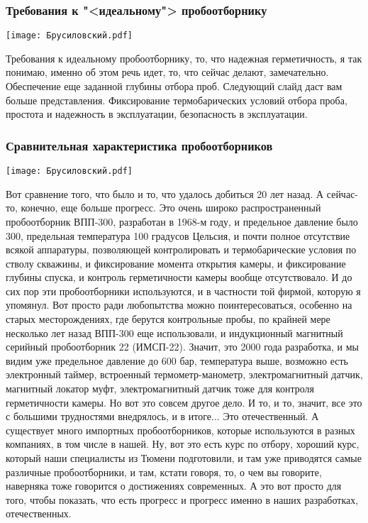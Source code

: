 \documentclass[main.tex]{subfiles}
\begin{document}
\subsubsection{Требования к "<идеальному"> пробоотборнику}

\begin{center}
\texttt{[image: Брусиловский.pdf]}
\end{center}

Требования к идеальному пробоотборнику, то, что надежная герметичность, я так понимаю, именно об этом речь идет, то, что сейчас делают, замечательно.
Обеспечение еще заданной глубины отбора проб.
Следующий слайд даст вам больше представления.
Фиксирование термобарических условий отбора проба, простота и надежность в эксплуатации, безопасность в эксплуатации.

\subsubsection{Сравнительная характеристика пробоотборников}

\begin{center}
\texttt{[image: Брусиловский.pdf]}
\end{center}

Вот сравнение того, что было и то, что удалось добиться 20 лет назад.
А сейчас-то, конечно, еще больше прогресс.
Это очень широко распространенный пробоотборник ВПП-300, разработан в 1968-м году, и предельное давление было 300, предельная температура 100 градусов Цельсия, и почти полное отсутствие всякой аппаратуры, позволяющей контролировать и термобарические условия по стволу скважины, и фиксирование момента открытия камеры, и фиксирование глубины спуска, и контроль герметичности камеры вообще отсутствовало.
И до сих пор эти пробоотборники используются, и в частности той фирмой, которую я упомянул.
Вот просто ради любопытства можно поинтересоваться, особенно на старых месторождениях, где берутся контрольные пробы, по крайней мере несколько лет назад ВПП-300 еще использовали, и индукционный магнитный серийный пробоотборник 22 (ИМСП-22).
Значит, это 2000 года разработка, и мы видим уже предельное давление до 600 бар, температура выше, возможно есть электронный таймер, встроенный термометр-манометр, электромагнитный датчик, магнитный локатор муфт, электромагнитный датчик тоже для контроля герметичности камеры.
Но вот это совсем другое дело.
И то, и то, значит, все это с большими трудностями внедрялось, и в итоге... Это отечественный.
А существует много импортных пробоотборников, которые используются в разных компаниях, в том числе в нашей.
Ну, вот это есть курс по отбору, хороший курс, который наши специалисты из Тюмени подготовили, и там уже приводятся самые различные пробоотборники, и там, кстати говоря, то, о чем вы говорите, наверняка тоже говорится о достижениях современных.
А это вот просто для того, чтобы показать, что есть прогресс и прогресс именно в наших разработках, отечественных.
\end{document}
